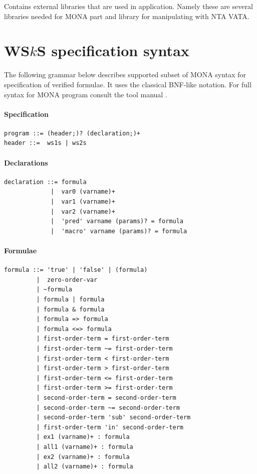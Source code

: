 Contains external libraries that are used in application. Namely these are
several libraries needed for \textsc{MONA} part and library for manipulating
with NTA \textsc{VATA}.

\chapter{WS$k$S specification syntax}\label{syntax}

The following grammar below describes supported subset of \textsc{MONA} syntax
for specification of verified formulae. It uses the classical BNF-like notation.
For full syntax for \textsc{MONA} program consult the tool manual \cite{mona}.

\subsubsection{Specification}
\begin{verbatim}
program ::= (header;)? (declaration;)+
header ::=  ws1s | ws2s
\end{verbatim}

\subsubsection{Declarations}
\begin{verbatim}
declaration ::= formula
			 |  var0 (varname)+
             |  var1 (varname)+
             |  var2 (varname)+
             |  'pred' varname (params)? = formula
             |  'macro' varname (params)? = formula
\end{verbatim}

\subsubsection{Formulae}
\begin{verbatim}
formula ::= 'true' | 'false' | (formula)
         |  zero-order-var
         | ~formula
         | formula | formula
         | formula & formula
         | formula => formula
         | formula <=> formula
         | first-order-term = first-order-term 
         | first-order-term ~= first-order-term 
         | first-order-term < first-order-term 
         | first-order-term > first-order-term
         | first-order-term <= first-order-term 
         | first-order-term >= first-order-term
         | second-order-term = second-order-term
         | second-order-term ~= second-order-term
         | second-order-term 'sub' second-order-term
         | first-order-term 'in' second-order-term
         | ex1 (varname)+ : formula
         | all1 (varname)+ : formula
         | ex2 (varname)+ : formula
         | all2 (varname)+ : formula
\end{verbatim}

